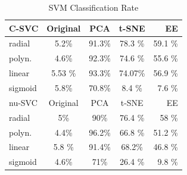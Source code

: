 \documentclass{article}
\begin{document}
\begin{table}[]
\caption{SVM Classification Rate }
\label{svmrates}
\begin{center}
\begin{small}
\begin{sc}

\begin{tabular}{lcccr}
\hline
\abovespace\belowspace
C-SVC 		& Original 	& PCA	 & t-SNE 		 & EE  \\
\hline
\abovespace
radial 		& 5.2\% 	& 91.3\% 	& 78.3 \% 	 	& 59.1 \% \\
polyn. 		& 4.6\%  	& 92.3\% 	& 74.6 \% 		& 55.6 \% \\ 
linear 		& 5.53 \%  & 93.3\% & 74.07\% 	 	& 56.9 \% \\
\belowspace
sigmoid		& 5.8\% 	& 70.8\% 	& 8.4 \% 	 	& 7.6 \% \\
\hline
\hline
\abovespace\belowspace
nu-SVC 		& Original 	& PCA	 & t-SNE 		 & EE  \\
\hline
\abovespace
radial 		& 5\% 	& 90\% 	& 76.4 \% 	 	& 58 \% \\
polyn. 		& 4.4\%  	& 96.2\% 	& 66.8 \% 		& 51.2 \% \\ 
linear 		& 5.8 \%  	& 91.4\% 	& 68.2\% 	 	& 46.8 \% \\
\belowspace
sigmoid		& 4.6\% 	& 71\% 	& 26.4 \% 	 	& 9.8 \% \\
\hline
\end{tabular}
\end{sc}
\end{small}
\end{center}
\vskip -0.2in
\end{table}

%
\end{document}

